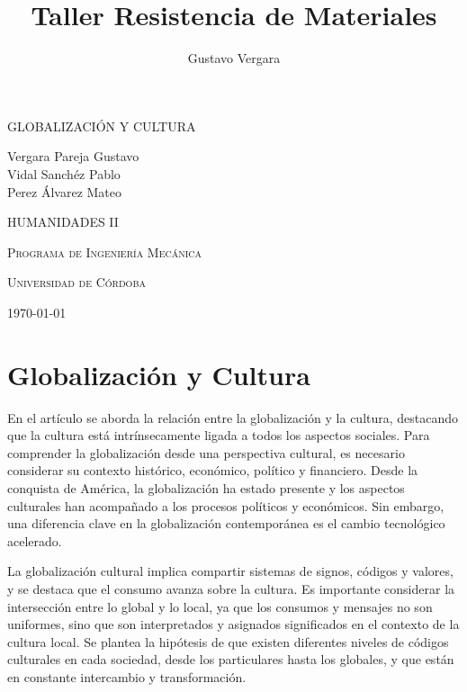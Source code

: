 \documentclass{article}
\title{Taller Resistencia de Materiales}
\author{Gustavo Vergara}
\theoremstyle{mytheoremstyle}
\theoremstyle{mytheoremstyle}
\theoremstyle{myproblemstyle}
\begin{document}
    \begin{titlepage}
\centering


\vspace{3cm}
{\scshape\Huge GLOBALIZACIÓN Y CULTURA \par}
\vspace{5cm}
\textbf\large\scshape{\par}
     \vspace{4cm}
     
{\Large Vergara Pareja Gustavo\\Vidal Sanchéz Pablo\\Perez Álvarez Mateo\\\par}
\vspace{5cm}
{\scshape\Large HUMANIDADES II \par}
\vspace{0.5cm}
{\scshape\Large Programa de Ingeniería Mecánica \par}
\vspace{1cm}
{\scshape\Large Universidad de Córdoba\par}
\vspace{1cm}
{\Large \today \par}
\end{titlepage}


 \newpage

\section*{Globalización y Cultura}

En el artículo se aborda la relación entre la globalización y la cultura, destacando que la cultura está intrínsecamente ligada a todos los aspectos sociales. Para comprender la globalización desde una perspectiva cultural, es necesario considerar su contexto histórico, económico, político y financiero. Desde la conquista de América, la globalización ha estado presente y los aspectos culturales han acompañado a los procesos políticos y económicos. Sin embargo, una diferencia clave en la globalización contemporánea es el cambio tecnológico acelerado.

La globalización cultural implica compartir sistemas de signos, códigos y valores, y se destaca que el consumo avanza sobre la cultura. Es importante considerar la intersección entre lo global y lo local, ya que los consumos y mensajes no son uniformes, sino que son interpretados y asignados significados en el contexto de la cultura local. Se plantea la hipótesis de que existen diferentes niveles de códigos culturales en cada sociedad, desde los particulares hasta los globales, y que están en constante intercambio y transformación. 
\end{document}
